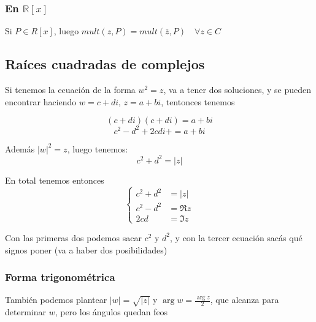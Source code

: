 \documentclass{article}
\def\R{\mathbb{R}}
\begin{document}
\subsubsection{En $\R[x]$}

Si $P \in R[x]$, luego $mult(z, P) = mult(\overline{z}, P) \quad \forall z \in C$

\subsection{Raíces cuadradas de complejos}
Si tenemos la ecuación de la forma $w^2 = z$, va a tener dos soluciones, y
se pueden encontrar haciendo $w = c + di$, $z = a + bi$, tentonces tenemos

\[
	(c + di)(c + di) = a + bi
\]
\[
	c^2 - d^2 + 2cdi +  = a + bi
\]

Además $|w|^2 = z$, luego tenemos:
\[
	c^2 + d^2 = |z|
\]

En total tenemos entonces
\[
\begin{cases}
	c^2+d^2 & = |z| \\
	c^2 - d^2 & = \Re z \\
	2cd & = \Im z
\end{cases}
\]

Con las primeras dos podemos sacar $c^2$ y $d^2$, y con la tercer ecuación
sacás qué signos poner (va a haber dos posibilidades)

\subsubsection{Forma trigonométrica}
También podemos plantear $|w| = \sqrt{|z|}$ y $\arg w = \frac{\arg z}{2}$,
que alcanza para determinar $w$, pero los ángulos quedan feos
\end{document}
